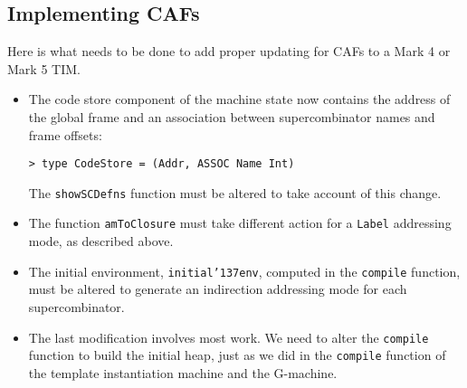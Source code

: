\subsection{Implementing CAFs}

Here is what needs to be done to add
proper updating for CAFs to a Mark 4 or Mark 5 TIM.
\begin{itemize}
\item
The code store component of the machine state now contains the address of the
global frame and an association between supercombinator names and frame offsets:
\begin{verbatim}
> type CodeStore = (Addr, ASSOC Name Int)
\end{verbatim}
%
The \mbox{\tt showSCDefns} function must be altered to take account of this change.

\item
The function \mbox{\tt amToClosure} must take different
action for a \mbox{\tt Label} addressing mode,
as described above.

\item
The initial environment, \mbox{\tt initial{\char'137}env}, computed in the \mbox{\tt compile} function,
must be altered to
generate an indirection addressing mode for each supercombinator.

\item
The last modification involves most work.
We need to alter the \mbox{\tt compile} function
to build the initial heap, just as we did in
the \mbox{\tt compile} function of the template instantiation machine and the G-machine.
\end{itemize}


